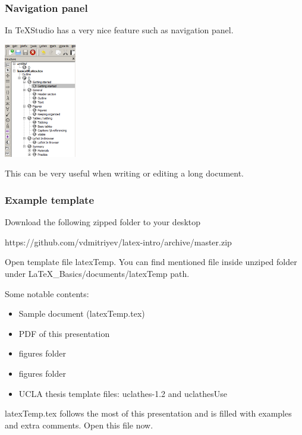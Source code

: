 \documentclass[slidestop,compress,mathserif]{beamer}
\begin{document}

\begin{frame} \frametitle{Navigation panel}
	
In TeXStudio has a very nice feature such as navigation panel.

\begin{center} 					\includegraphics[height=5cm]{basicsOfLatex/gettingStarted/texstudioNavigationPanel}
\end{center}

This can be very useful when writing or editing a long document.
\end{frame}


\begin{frame} \frametitle{Example template}
	
Download the following zipped folder to your desktop
\begin{center}
	{\color{highlight} https://github.com/vdmitriyev/latex-intro/archive/master.zip}
\end{center}

Open template file {\color{highlight}latexTemp}. You can find mentioned file inside unziped folder under {LaTeX\_Basics/documents/latexTemp} path. 

\vspace{0.2cm}

Some notable contents:
\begin{itemize}
	\item Sample document ({\color{highlight}latexTemp.tex})
	\item PDF of this presentation
	\item {\color{highlight}figures} folder
	\item {\color{highlight}figures} folder
	\item UCLA thesis template files: {\color{highlight}uclathes-1.2} and {\color{highlight}uclathesUse}
\end{itemize}

{\color{highlight}latexTemp.tex} follows the most of this presentation and is filled with examples and extra comments. Open this file now.

\end{frame}
\end{document}
